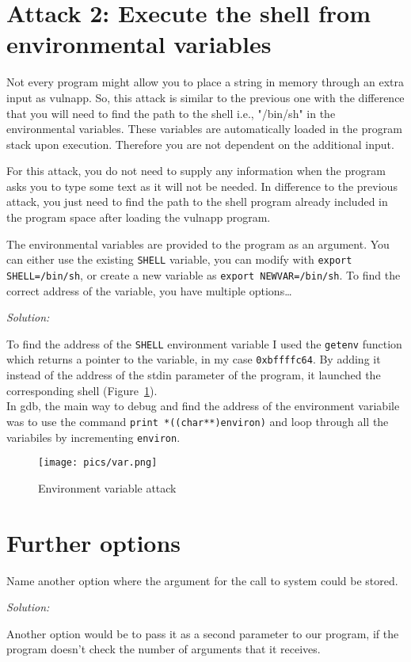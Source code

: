 \documentclass[a4paper,11pt]{article}
\newenvironment{solution}%
{\par{\noindent\small\textit{Solution:}}\vspace{-12pt}\begin{framed}}%
{\end{framed}\par}
\begin{document}
\section*{Attack 2: Execute the shell from environmental variables}

Not every program might allow you to place a string in memory through an extra
input as vulnapp. So, this attack is similar to the previous one with the
difference that you will need to find the path to the shell i.e., "/bin/sh" in
the environmental variables.  These variables are automatically loaded in the
program stack upon execution. Therefore you are not dependent on the additional
input.

For this attack, you do not need to supply any information when the program asks you
to type some text as it will not be needed. In difference to the previous attack,
you just need to find the path to the shell program already included in the program
space after loading the vulnapp program.

The environmental variables are provided to the program as an argument. You can
either use the existing \texttt{SHELL} variable, you can modify with
\texttt{export SHELL=/bin/sh}, or create a new variable as \texttt{export
NEWVAR=/bin/sh}. To find the correct address of the variable, you have multiple
options\dots

\ifsolution\begin{solution}
To find the address of the \texttt{SHELL} environment variable I used the \texttt{getenv}
function which returns a pointer to the variable, in my case \texttt{0xbffffc64}.
By adding it instead of the address of the stdin parameter of the program, it launched
the corresponding shell (Figure~\ref{fig:var}).\\
In gdb, the main way to debug and find the address of the environment variabile was to use
the command \texttt{print *((char**)environ)} and loop through all the variabiles by
incrementing \texttt{environ}.

\end{solution}\fi

\begin{figure}[H] \center
  \texttt{[image: pics/var.png]}
  \caption{Environment variable attack}
  \label{fig:var}
\end{figure}

\section*{Further options}
Name another option where the argument for the call to system could be stored.
\ifsolution\begin{solution}
Another option would be to pass it as a second parameter to our program, if the program
doesn't check the number of arguments that it receives.
\end{solution}\fi
\end{document}
